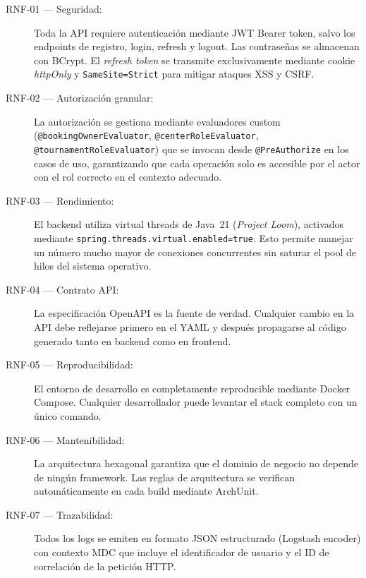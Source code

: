 \begin{description}
  \item[RNF-01 — Seguridad:] Toda la API requiere autenticación mediante JWT
    Bearer token, salvo los endpoints de registro, login, refresh y logout. Las
    contraseñas se almacenan con BCrypt. El \textit{refresh token} se transmite
    exclusivamente mediante cookie \textit{httpOnly} y \texttt{SameSite=Strict}
    para mitigar ataques XSS y CSRF.

  \item[RNF-02 — Autorización granular:] La autorización se gestiona mediante
    evaluadores custom (\texttt{@bookingOwnerEvaluator},
    \texttt{@centerRoleEvaluator}, \texttt{@tournamentRoleEvaluator}) que se
    invocan desde \texttt{@PreAuthorize} en los casos de uso, garantizando que
    cada operación solo es accesible por el actor con el rol correcto en el
    contexto adecuado.

  \item[RNF-03 — Rendimiento:] El backend utiliza virtual threads de Java~21
    (\textit{Project Loom}), activados mediante
    \texttt{spring.threads.virtual.enabled=true}. Esto permite manejar un número
    mucho mayor de conexiones concurrentes sin saturar el pool de hilos del
    sistema operativo.

  \item[RNF-04 — Contrato API:] La especificación OpenAPI es la fuente de verdad.
    Cualquier cambio en la API debe reflejarse primero en el YAML y después
    propagarse al código generado tanto en backend como en frontend.

  \item[RNF-05 — Reproducibilidad:] El entorno de desarrollo es completamente
    reproducible mediante Docker Compose. Cualquier desarrollador puede levantar
    el stack completo con un único comando.

  \item[RNF-06 — Mantenibilidad:] La arquitectura hexagonal garantiza que el
    dominio de negocio no depende de ningún framework. Las reglas de arquitectura
    se verifican automáticamente en cada build mediante ArchUnit.

  \item[RNF-07 — Trazabilidad:] Todos los logs se emiten en formato JSON
    estructurado (Logstash encoder) con contexto MDC que incluye el identificador
    de usuario y el ID de correlación de la petición HTTP.
\end{description}

